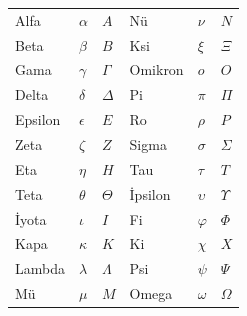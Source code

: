 \documentclass[../../../include/open-logic-chapter]{subfiles}
\begin{document}

\begin{center}
    \begin{tabular}{lll@{\qquad}lll}
    Alfa & $\alpha$ & $A$ &
    Nü & $\nu$ & $N$ \\
    Beta & $\beta$ & $B$ &
    Ksi & $\xi$ & $\Xi$ \\
    Gama & $\gamma$ & $\Gamma$ &
    Omikron & $o$ & $O$ \\
    Delta & $\delta$ & $\Delta$ &
    Pi & $\pi$ & $\Pi$ \\
    Epsilon & $\epsilon$ & $E$ &
    Ro & $\rho$ & $P$ \\
    Zeta & $\zeta$ & $Z$ &
    Sigma & $\sigma$ & $\Sigma$ \\
    Eta & $\eta$ & $H$ &
    Tau & $\tau$ & $T$ \\
    Teta & $\theta$ & $\Theta$ &
    İpsilon & $\upsilon$ & $\Upsilon$ \\
    İyota & $\iota$ & $I$ &
    Fi & $\varphi$ & $\Phi$ \\
    Kapa & $\kappa$ & $K$ &
    Ki & $\chi$ & $X$ \\
    Lambda & $\lambda$ & $\Lambda$ &
    Psi & $\psi$ & $\Psi$ \\
    Mü & $\mu$ & $M$ &
    Omega & $\omega$ & $\Omega$
    \end{tabular}
\end{center}
\end{document}
